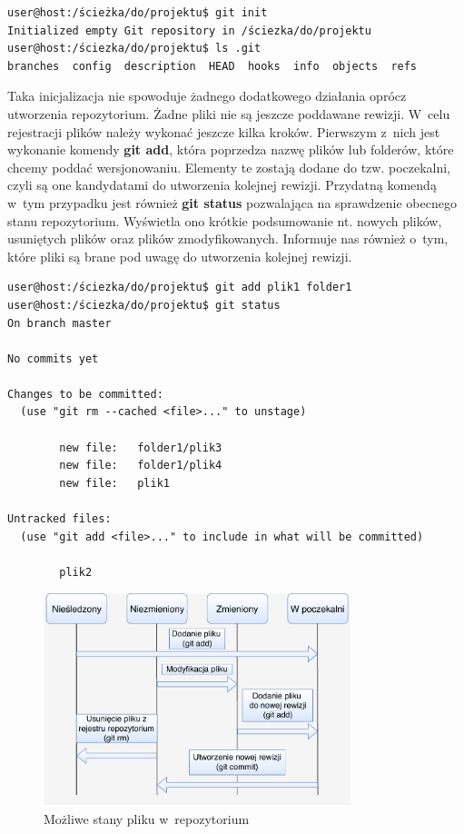 \begin{lstlisting}[language=bash,language=Cmd,caption={Inicjalizacja repozytorium git}]
user@host:/ścieżka/do/projektu$ git init
Initialized empty Git repository in /ściezka/do/projektu
user@host:/ściezka/do/projektu$ ls .git
branches  config  description  HEAD  hooks  info  objects  refs
\end{lstlisting}

Taka inicjalizacja nie spowoduje żadnego dodatkowego działania oprócz utworzenia repozytorium. Żadne pliki nie są jeszcze poddawane rewizji. W~celu rejestracji plików należy wykonać jeszcze kilka kroków. Pierwszym z~nich jest wykonanie komendy \textbf{git add}, która poprzedza nazwę plików lub folderów, które chcemy poddać wersjonowaniu. Elementy te zostają dodane do tzw. poczekalni, czyli są one kandydatami do utworzenia kolejnej rewizji. Przydatną komendą w~tym przypadku jest również \textbf{git status} pozwalająca na sprawdzenie obecnego stanu repozytorium. Wyświetla ono krótkie podsumowanie nt. nowych plików, usuniętych plików oraz plików zmodyfikowanych. Informuje nas również o~tym, które pliki są brane pod uwagę do utworzenia kolejnej rewizji.

\begin{lstlisting}[language=Cmd,caption={Dodawanie elementów do poczekalni}]
user@host:/ściezka/do/projektu$ git add plik1 folder1
user@host:/ściezka/do/projektu$ git status
On branch master

No commits yet

Changes to be committed:
  (use "git rm --cached <file>..." to unstage)

        new file:   folder1/plik3
        new file:   folder1/plik4
        new file:   plik1

Untracked files:
  (use "git add <file>..." to include in what will be committed)

        plik2
\end{lstlisting}

\begin{figure}[H]
\centering
\includegraphics[width=0.8\textwidth]{res/fileStates.pdf}
\caption{Możliwe stany pliku w~repozytorium \cite{GitChart}} 
\end{figure}

